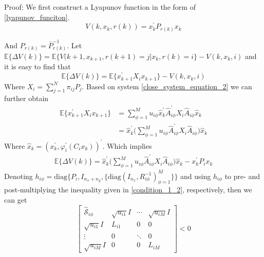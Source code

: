 \documentclass[conference]{IEEEtran}
\begin{document}
Proof: We first construct a Lyapunov function in the form of \eqref{lyapunov_funciton}.
\begin{equation}\label{lyapunov_funciton} 
	V(k,x_k,r(k))=x^{'}_{k}P_{r(k)}x_{k}
\end{equation}


And $P_{r(k)}=\bar{P}^{-1}_{r(k)}$. Let $\mathbb{E}\{\varDelta V(k)\}=\mathbb{E}\{V(k+1,x_{k+1},r(k+1)=j|x_k,r(k)=i \}-V(k,x_k,i)$ and it is easy to find that
\begin{equation} \label{lypfunction}
	\mathbb{E}\{\varDelta V(k)\}=\mathbb{E}\{x^{'}_{k+1}X_{i} x_{k+1} \}-V(k,x_k,i)
\end{equation} 
Where $X_{i} = \sum_{j=1}^{N}\pi_{ij}P_{j}$. Based on system \eqref{close_system_equation_2} we can further obtain \\
\begin{equation}
	\begin{split}
		\mathbb{E}\{x^{'}_{k+1}X_{i} x_{k+1} \}& = \sum_{\phi=1}^{M} u_{i\phi} \hat{x}^{'}_{k} \hat{A}^{'}_{i\phi}X_{i}\hat{A}_{i\phi}\hat{x}_{k}\\
		&=\hat{x}^{'}_{k} \Big( \sum_{\phi=1}^{M}u_{i\phi}\hat{A}^{'}_{i\phi}X_{i}\hat{A}_{i\phi}\Big) \hat{x}_{k} 
	\end{split}
\end{equation}
Where $\hat{x}_{k}=(x^{'}_k,\varphi^{'}_{i}(C_{i}x_{k}))^{'}$. Which implies
\begin{equation} \label{leq18}
	\begin{split}
		\mathbb{E}\{\varDelta V(k)\}=\hat{x}^{'}_{k} \Big( \sum_{\phi=1}^{M}u_{i\phi}\hat{A}^{'}_{i\phi}X_{i}\hat{A}_{i\phi}\Big) \hat{x}_{k} -x^{'}_{k}P_{i}x_{k}
	\end{split}
\end{equation}
Denoting $h_{i\phi} = \mathrm{diag}\{P_{i}, I_{n_x+n_y},\{\mathrm{diag}(I_{n_x},R^{-1}_{i\phi})^{M}_{\phi=1} \} \}$ and using $h_{i\phi}$ to pre- and post-multiplying the inequality given in \eqref{condition_1_2}, respectively, then we can get \\
\begin{equation}\label{st}
\begin{bmatrix} 
	\hat{\mathscr{S}}_{i\phi}&
\sqrt{u_{i1}}I&
\cdots&
\sqrt{u_{iM}}I\\
\sqrt{u_{i1}}I&L_{i1}&0&0\\ 
\vdots&0&\ddots&0\\
\sqrt{u_{iM}}I&0&0&
L_{iM}

\end{bmatrix} <0
\end{equation}
\end{document}
